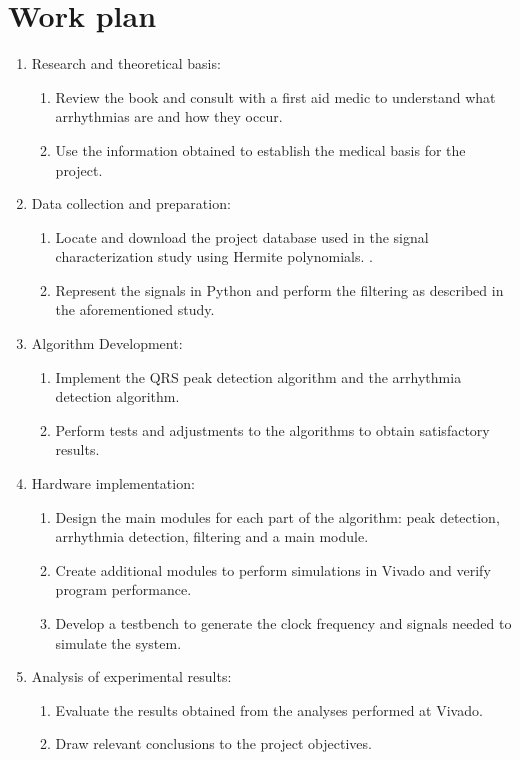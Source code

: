 \section*{Work plan}
\begin{enumerate}
	\item Research and theoretical basis:
	
	\begin{enumerate}
		\item Review the book\cite{velez} and consult with a first aid medic to understand what arrhythmias are and how they occur.
	
		\item Use the information obtained to establish the medical basis for the project.
	\end{enumerate}

	\item Data collection and preparation:
	\begin{enumerate}
		\item Locate and download the project database used in the signal characterization study using Hermite polynomials. \cite{desai2021low}.

		\item Represent the signals in Python and perform the filtering as described in the aforementioned study.
	\end{enumerate}
	\item Algorithm Development:
	\begin{enumerate}
		\item Implement the QRS peak detection algorithm and the arrhythmia detection algorithm.

		\item Perform tests and adjustments to the algorithms to obtain satisfactory results.
	\end{enumerate}
	
	\item Hardware implementation: 
	\begin{enumerate}
		\item Design the main modules for each part of the algorithm: peak detection, arrhythmia detection, filtering and a main module.

		\item Create additional modules to perform simulations in Vivado and verify program performance.
		\item Develop a testbench to generate the clock frequency and signals needed to simulate the system.
	\end{enumerate}

	\item Analysis of experimental results:
	\begin{enumerate}
		\item Evaluate the results obtained from the analyses performed at Vivado.

		\item Draw relevant conclusions to the project objectives.
	\end{enumerate}
\end{enumerate}


